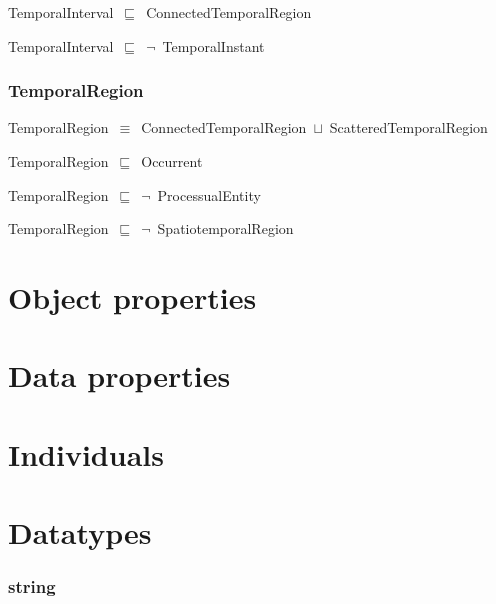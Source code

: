 \documentclass{article}
\begin{document}
TemporalInterval~\ensuremath{\sqsubseteq}~ConnectedTemporalRegion~

TemporalInterval~\ensuremath{\sqsubseteq}~\ensuremath{\lnot}~TemporalInstant

\subsubsection*{TemporalRegion}

TemporalRegion~\ensuremath{\equiv}~ConnectedTemporalRegion~\ensuremath{\sqcup}~ScatteredTemporalRegion

TemporalRegion~\ensuremath{\sqsubseteq}~Occurrent~

TemporalRegion~\ensuremath{\sqsubseteq}~\ensuremath{\lnot}~ProcessualEntity

TemporalRegion~\ensuremath{\sqsubseteq}~\ensuremath{\lnot}~SpatiotemporalRegion

\section*{Object properties}\section*{Data properties}\section*{Individuals}\section*{Datatypes}\subsubsection*{string}
\end{document}
